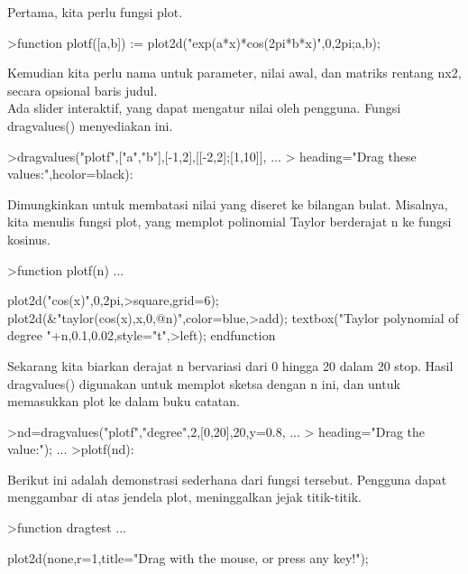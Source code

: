 \documentclass[a4paper,10pt]{article}
\begin{document}
\begin{eulernotebook}
\begin{eulercomment}
\begin{eulercomment}
\begin{eulercomment}
\begin{eulercomment}
\begin{eulercomment}
\begin{eulercomment}
\begin{eulercomment}
\begin{eulercomment}
\begin{eulercomment}
\begin{eulercomment}
\begin{eulercomment}
\begin{eulercomment}
\begin{eulercomment}
Pertama, kita perlu fungsi plot.
\end{eulercomment}
\begin{eulerprompt}
>function plotf([a,b]) := plot2d("exp(a*x)*cos(2pi*b*x)",0,2pi;a,b);
\end{eulerprompt}
\begin{eulercomment}
Kemudian kita perlu nama untuk parameter, nilai awal, dan matriks
rentang nx2, secara opsional baris judul.\\
Ada slider interaktif, yang dapat mengatur nilai oleh pengguna. Fungsi
dragvalues() menyediakan ini.
\end{eulercomment}
\begin{eulerprompt}
>dragvalues("plotf",["a","b"],[-1,2],[[-2,2];[1,10]], ...
>  heading="Drag these values:",hcolor=black):
\end{eulerprompt}
\begin{eulercomment}
Dimungkinkan untuk membatasi nilai yang diseret ke bilangan bulat.
Misalnya, kita menulis fungsi plot, yang memplot polinomial Taylor
berderajat n ke fungsi kosinus.
\end{eulercomment}
\begin{eulerprompt}
>function plotf(n) ...
\end{eulerprompt}
\begin{eulerudf}
  plot2d("cos(x)",0,2pi,>square,grid=6);
  plot2d(&"taylor(cos(x),x,0,@n)",color=blue,>add);
  textbox("Taylor polynomial of degree "+n,0.1,0.02,style="t",>left);
  endfunction
\end{eulerudf}
\begin{eulercomment}
Sekarang kita biarkan derajat n bervariasi dari 0 hingga 20 dalam 20
stop. Hasil dragvalues() digunakan untuk memplot sketsa dengan n ini,
dan untuk memasukkan plot ke dalam buku catatan.
\end{eulercomment}
\begin{eulerprompt}
>nd=dragvalues("plotf","degree",2,[0,20],20,y=0.8, ...
>   heading="Drag the value:"); ...
>plotf(nd):
\end{eulerprompt}
\begin{eulercomment}
Berikut ini adalah demonstrasi sederhana dari fungsi tersebut.
Pengguna dapat menggambar di atas jendela plot, meninggalkan jejak
titik-titik.
\end{eulercomment}
\begin{eulerprompt}
>function dragtest ...
\end{eulerprompt}
\begin{eulerudf}
   plot2d(none,r=1,title="Drag with the mouse, or press any key!");

\end{eulerudf}
\end{eulercomment}
\end{eulercomment}
\end{eulercomment}
\end{eulercomment}
\end{eulercomment}
\end{eulercomment}
\end{eulercomment}
\end{eulercomment}
\end{eulercomment}
\end{eulercomment}
\end{eulercomment}
\end{eulercomment}
\end{eulernotebook}
\end{document}
